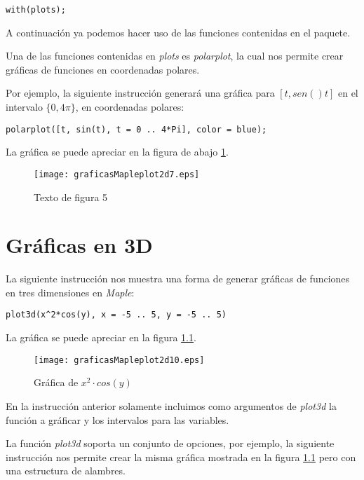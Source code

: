 \documentclass[letterpaper,12pt]{book}
\begin{document}
\begin{verbatim}
with(plots);
\end{verbatim}

A continuación ya podemos hacer uso de las funciones contenidas en el paquete.

Una de las funciones contenidas en \emph{plots} es \emph{polarplot}, la cual nos
permite crear gráficas de funciones en coordenadas polares.

Por ejemplo, la siguiente instrucción generará una gráfica para 
$[t, sen()t]$ en el intervalo $\{0, 4\pi\}$, en coordenadas polares:

\begin{verbatim}
polarplot([t, sin(t), t = 0 .. 4*Pi], color = blue);
\end{verbatim}

La gráfica se puede apreciar en la figura de abajo \ref{cap5f1}.

\begin{figure}[h!]
\centering
\texttt{[image: graficasMapleplot2d7.eps]}
\caption{Texto de figura 5}\label{cap5f1}
\end{figure}


\chapter{Gráficas en 3D}

La siguiente instrucción nos muestra una forma de generar gráficas de funciones en tres dimensiones en \emph{Maple}:

\begin{verbatim}
plot3d(x^2*cos(y), x = -5 .. 5, y = -5 .. 5)
\end{verbatim}

La gráfica se puede apreciar en la figura \ref{cap6f1}.

\begin{figure}[h!]
\centering
\texttt{[image: graficasMapleplot2d10.eps]}
\caption{Gráfica de $x^2\cdot cos(y)$}\label{cap6f1}
\end{figure}

En la instrucción anterior solamente incluimos como argumentos de \emph{plot3d} la función 
a gráficar y los intervalos para las variables.

La función \emph{plot3d} soporta un conjunto de opciones, por ejemplo, la siguiente instrucción 
nos permite crear la misma gráfica mostrada en la figura \ref{cap6f1} pero con una estructura de
alambres.
\end{document}
